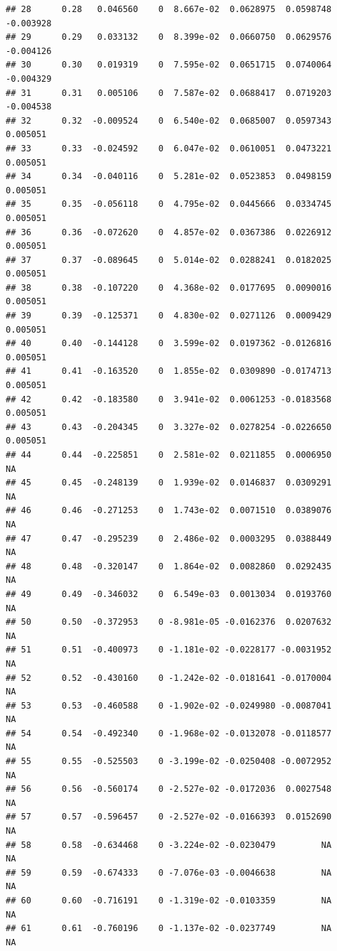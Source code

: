 \documentclass{article}\usepackage[]{graphicx}\usepackage[]{color}
\makeatletter
\newenvironment{kframe}{%
 \def\at@end@of@kframe{}%
 \ifinner\ifhmode%
  \def\at@end@of@kframe{\end{minipage}}%
  \begin{minipage}{\columnwidth}%
 \fi\fi%
 \def\FrameCommand##1{\hskip\@totalleftmargin \hskip-\fboxsep
 \colorbox{shadecolor}{##1}\hskip-\fboxsep
     \hskip-\linewidth \hskip-\@totalleftmargin \hskip\columnwidth}%
 \MakeFramed {\advance\hsize-\width
   \@totalleftmargin\z@ \linewidth\hsize
   \@setminipage}}%
 {\par\unskip\endMakeFramed%
 \at@end@of@kframe}
\newenvironment{knitrout}{}{} %
\makeatother
\begin{document}
\begin{knitrout}
\begin{kframe}
\begin{verbatim}
## 28      0.28   0.046560    0  8.667e-02  0.0628975  0.0598748   -0.003928
## 29      0.29   0.033132    0  8.399e-02  0.0660750  0.0629576   -0.004126
## 30      0.30   0.019319    0  7.595e-02  0.0651715  0.0740064   -0.004329
## 31      0.31   0.005106    0  7.587e-02  0.0688417  0.0719203   -0.004538
## 32      0.32  -0.009524    0  6.540e-02  0.0685007  0.0597343    0.005051
## 33      0.33  -0.024592    0  6.047e-02  0.0610051  0.0473221    0.005051
## 34      0.34  -0.040116    0  5.281e-02  0.0523853  0.0498159    0.005051
## 35      0.35  -0.056118    0  4.795e-02  0.0445666  0.0334745    0.005051
## 36      0.36  -0.072620    0  4.857e-02  0.0367386  0.0226912    0.005051
## 37      0.37  -0.089645    0  5.014e-02  0.0288241  0.0182025    0.005051
## 38      0.38  -0.107220    0  4.368e-02  0.0177695  0.0090016    0.005051
## 39      0.39  -0.125371    0  4.830e-02  0.0271126  0.0009429    0.005051
## 40      0.40  -0.144128    0  3.599e-02  0.0197362 -0.0126816    0.005051
## 41      0.41  -0.163520    0  1.855e-02  0.0309890 -0.0174713    0.005051
## 42      0.42  -0.183580    0  3.941e-02  0.0061253 -0.0183568    0.005051
## 43      0.43  -0.204345    0  3.327e-02  0.0278254 -0.0226650    0.005051
## 44      0.44  -0.225851    0  2.581e-02  0.0211855  0.0006950          NA
## 45      0.45  -0.248139    0  1.939e-02  0.0146837  0.0309291          NA
## 46      0.46  -0.271253    0  1.743e-02  0.0071510  0.0389076          NA
## 47      0.47  -0.295239    0  2.486e-02  0.0003295  0.0388449          NA
## 48      0.48  -0.320147    0  1.864e-02  0.0082860  0.0292435          NA
## 49      0.49  -0.346032    0  6.549e-03  0.0013034  0.0193760          NA
## 50      0.50  -0.372953    0 -8.981e-05 -0.0162376  0.0207632          NA
## 51      0.51  -0.400973    0 -1.181e-02 -0.0228177 -0.0031952          NA
## 52      0.52  -0.430160    0 -1.242e-02 -0.0181641 -0.0170004          NA
## 53      0.53  -0.460588    0 -1.902e-02 -0.0249980 -0.0087041          NA
## 54      0.54  -0.492340    0 -1.968e-02 -0.0132078 -0.0118577          NA
## 55      0.55  -0.525503    0 -3.199e-02 -0.0250408 -0.0072952          NA
## 56      0.56  -0.560174    0 -2.527e-02 -0.0172036  0.0027548          NA
## 57      0.57  -0.596457    0 -2.527e-02 -0.0166393  0.0152690          NA
## 58      0.58  -0.634468    0 -3.224e-02 -0.0230479         NA          NA
## 59      0.59  -0.674333    0 -7.076e-03 -0.0046638         NA          NA
## 60      0.60  -0.716191    0 -1.319e-02 -0.0103359         NA          NA
## 61      0.61  -0.760196    0 -1.137e-02 -0.0237749         NA          NA

\end{verbatim}
\end{kframe}
\end{knitrout}
\end{document}
